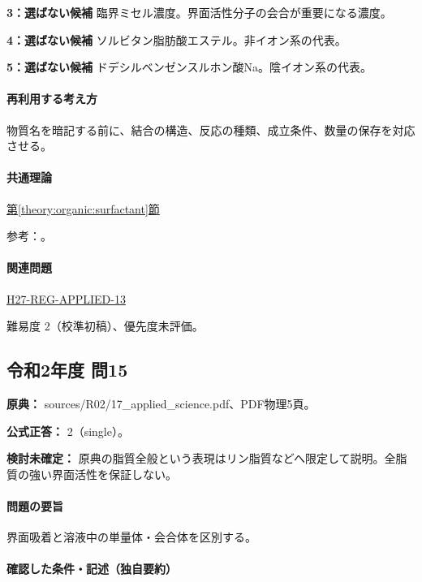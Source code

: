\noindent\textbf{3：選ばない候補} 臨界ミセル濃度。界面活性分子の会合が重要になる濃度。\par

\noindent\textbf{4：選ばない候補} ソルビタン脂肪酸エステル。非イオン系の代表。\par

\noindent\textbf{5：選ばない候補} ドデシルベンゼンスルホン酸Na。陰イオン系の代表。\par

\paragraph{再利用する考え方} 物質名を暗記する前に、結合の構造、反応の種類、成立条件、数量の保存を対応させる。

\paragraph{共通理論} \hyperref[theory:organic:surfactant]{第\ref*{theory:organic:surfactant}節}

\par 参考：\cite{organic_cmc}。

\paragraph{関連問題} \hyperref[q:h27-reg-applied-13]{H27-REG-APPLIED-13}

\par 難易度 2（校準初稿）、優先度未評価。

\subsection{令和2年度 問15}
\label{q:r02-reg-applied-15}

\noindent\textbf{原典：} sources/R02/17\_applied\_science.pdf、PDF物理5頁。

\textbf{公式正答：} 2（single）。

\par\textbf{検討未確定：} 原典の脂質全般という表現はリン脂質などへ限定して説明。全脂質の強い界面活性を保証しない。

\paragraph{問題の要旨} 界面吸着と溶液中の単量体・会合体を区別する。

\paragraph{確認した条件・記述（独自要約）}\mbox{}\par

